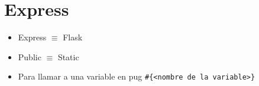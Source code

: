 \section{Express}
\begin{itemize}
    \item Express $\equiv$ Flask
    \item Public $\equiv$ Static
    \item Para llamar a una variable en pug \verb|#{<nombre de la variable>}|
\end{itemize}
